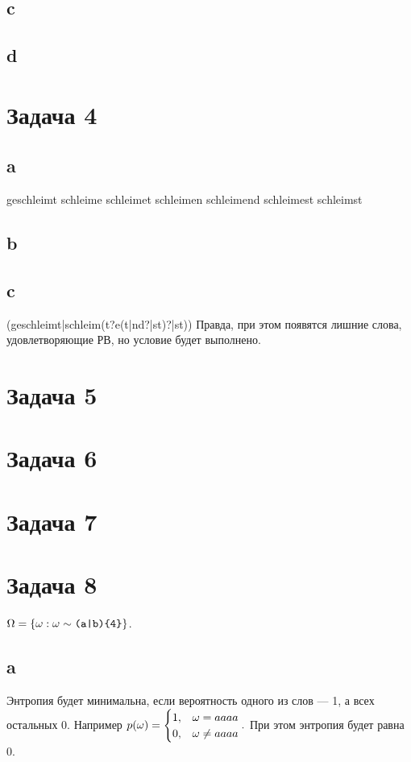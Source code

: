 \documentclass[12pt]{article}
\begin{document}
\subsection{c}
{}
\subsection{d}
{}

\section{Задача 4}
{}
\subsection{a}
geschleimt
schleime
schleimet
schleimen
schleimend
schleimest
schleimst
\subsection{b}
\subsection{c}
{\ttfamily (geschleimt|schleim(t?e(t|nd?|st)?|st))}
Правда, при этом появятся лишние слова, удовлетворяющие РВ, но условие будет выполнено.

\section{Задача 5}
\section{Задача 6}
\section{Задача 7}
\section{Задача 8}
$\Omega=\left\{\omega: \omega \sim \text{\ttfamily(a|b)\{4\}}\right\}$.
\subsection{a}
Энтропия будет минимальна, если вероятность одного из слов --- 1, а всех остальных 0. Например $p(\omega)=\begin{cases}1, &\omega=aaaa\\0, &\omega\ne aaaa\end{cases}.$ При этом энтропия будет равна 0.
\end{document}
